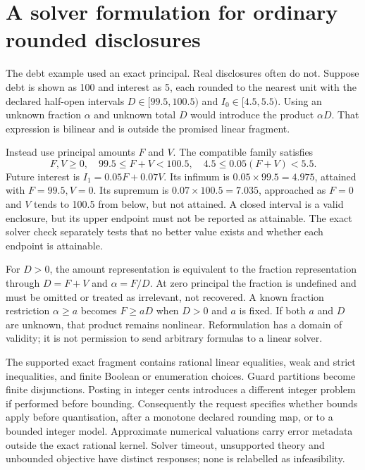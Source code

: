 \section{A solver formulation for ordinary rounded disclosures}

The debt example used an exact principal. Real disclosures often do not.
Suppose debt is shown as 100 and interest as 5, each rounded to the nearest
unit with the declared half-open intervals $D\in[99.5,100.5)$ and
$I_0\in[4.5,5.5)$. Using an unknown fraction $\alpha$ and unknown total $D$
would introduce the product $\alpha D$. That expression is bilinear and is
outside the promised linear fragment.

Instead use principal amounts $F$ and $V$. The compatible family satisfies
\begin{equation}\label{eq:rounded-debt}
 F,V\geq0,\quad 99.5\leq F+V<100.5,\quad
 4.5\leq0.05(F+V)<5.5.
\end{equation}
Future interest is $I_1=0.05F+0.07V$. Its infimum is
$0.05\times99.5=4.975$, attained with $F=99.5,V=0$. Its supremum is
$0.07\times100.5=7.035$, approached as $F=0$ and $V$ tends to 100.5
from below, but not attained. A closed interval is a valid enclosure, but
its upper endpoint must not be reported as attainable. The exact solver check separately
tests that no better value exists and whether each endpoint is attainable.

For $D>0$, the amount representation is equivalent to the fraction
representation through $D=F+V$ and $\alpha=F/D$. At zero principal the fraction
is undefined and must be omitted or treated as irrelevant, not recovered.
A known fraction restriction $\alpha\geq a$ becomes $F\geq aD$ when
$D>0$ and $a$ is fixed. If both $a$ and $D$ are unknown, that product remains
nonlinear. Reformulation has a domain of validity; it is not permission to
send arbitrary formulas to a linear solver.

The supported exact fragment contains rational linear equalities, weak and
strict inequalities, and finite Boolean or enumeration choices. Guard
partitions become finite disjunctions. Posting in integer cents introduces a
different integer problem if performed before bounding. Consequently the
request specifies whether bounds apply before quantisation, after a monotone
declared rounding map, or to a bounded integer model. Approximate numerical
valuations carry error metadata outside the exact rational kernel. Solver
timeout, unsupported theory and unbounded objective have distinct responses;
none is relabelled as infeasibility.

